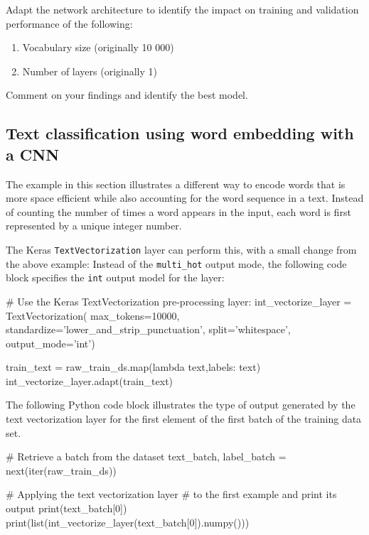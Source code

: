 \begin{exercisebox}

Adapt the network architecture to identify the impact on training and validation performance of the following:
   \begin{enumerate}
      \item Vocabulary size (originally 10 000)
      \item Number of layers (originally 1)
   \end{enumerate}
Comment on your findings and identify the best model.
\end{exercisebox}

\subsection[Word Embedding]{Text classification using word embedding with a CNN}

The example in this section illustrates a different way to encode words that is more space efficient while also accounting for the word sequence in a text. Instead of counting the number of times a word appears in the input, each word is first represented by a unique integer number. 

The Keras \texttt{TextVectorization} layer can perform this, with a small change from the above example: Instead of the \texttt{multi\_hot} output mode, the following code block specifies the \texttt{int} output model for the layer:

\begin{pythoncode}
# Use the Keras TextVectorization pre-processing layer:
int_vectorize_layer = TextVectorization(
    max_tokens=10000,
    standardize='lower_and_strip_punctuation',
    split='whitespace',
    output_mode='int')
    
train_text = raw_train_ds.map(lambda text,labels: text)
int_vectorize_layer.adapt(train_text)
\end{pythoncode}

The following Python code block illustrates the type of output generated by the text vectorization layer for the first element of the first batch of the training data set.

\begin{pythoncode}
# Retrieve a batch from the dataset
text_batch, label_batch = next(iter(raw_train_ds))

# Applying the text vectorization layer
# to the first example and print its output
print(text_batch[0])
print(list(int_vectorize_layer(text_batch[0]).numpy()))
\end{pythoncode}

